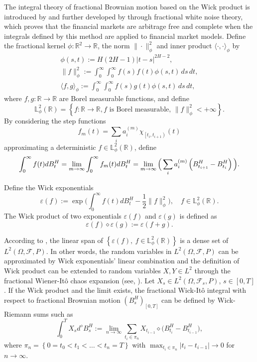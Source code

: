 \documentclass[10pt,a4paper]{amsart}
\numberwithin{equation}{section}
\begin{document}
The integral theory of fractional Brownian motion based on the Wick product is 
introduced by \cite{duncan2000stochastic} and further developed by 
\cite{hu2003fractional} through fractional white noise theory, which proves that 
the financial markets are arbitrage free and complete when the integrals defined by 
this method are applied to financial market models. Define the fractional kernel 
$\phi: \mathbb{R}^2 \to \mathbb{R}$, the norm $\|\cdot\|_\phi^2$ and inner
product $\langle\cdot, \cdot\rangle_\phi$ by
\begin{gather*}
\phi(s, t):=H(2 H-1)|t-s|^{2 H-2} ,\\
\|f\|_\phi^2  :=\int_0^{\infty} \int_0^{\infty} f(s) f(t) \phi(s, t) \,ds\,dt, \\
\langle f, g\rangle_\phi  :=\int_0^{\infty} \int_0^{\infty} f(s) g(t) \phi(s, t) \,ds\,dt,
\end{gather*}
where
$f, g:\mathbb{R} \to \mathbb{R}$ are Borel measurable functions, and define
\[
 \mathbb{L}_\phi^2\left(\mathbb{R}\right)=\left\{f:\mathbb{R} \to \mathbb{R},
 f  \text{ is Borel measurable, } \|f\|_\phi^2<+\infty\right\}.
\]
By considering the step functions
\[
 f_m(t)=\sum_i a_i^{(m)} \chi_{\left[t_i, t_{i+1}\right)}\left(t\right)
\]
approximating a deterministic $f \in \mathbb{L}_\phi^2\left(\mathbb{R}\right)$, define
\[
 \int_{0}^{\infty} f(t) d B_t^H
 =\lim _{m \to \infty} \int_{0}^{\infty}f_m(t) d B_t^H \\
 =\lim _{m \to \infty}\Big(\sum_i a_i^{(m)}\left(B_{t_{i+1}}^H-B_{t_i}^H\right)\Big).
\]

Define the Wick exponentials
\[
 \varepsilon(f):=\exp \Big(\int_0^{\infty} f(t) d B^H_t-\frac{1}{2}\|f\|_\phi^2\Big),
\quad f \in \mathbb{L}_\phi^2\left(\mathbb{R}\right).
\]
The Wick product of two exponentials $\varepsilon(f)$ and $\varepsilon(g)$ 
is defined as
\[
 \varepsilon(f) \diamond \varepsilon(g):=\varepsilon(f+g).
\]

According to \cite[Theorem 3.1]{duncan2000stochastic}, the linear span of 
$\left\{\varepsilon(f), \ f \in \mathbb{L}_\phi^2\left(\mathbb{R}\right)\right\}$ 
is a dense set of $L^2\left( \Omega,\mathcal{F} ,P \right)$. 
In other words, the random variables in $L^2\left( \Omega,\mathcal{F} ,P \right)$ 
can be approximated by Wick exponentials' linear combination and the definition 
of Wick product can be extended to random variables $X, Y \in L^2$ through the 
fractional Wiener-It\^o chaos expansion (see, \cite{hu2003fractional}). 
Let $X_s \in L^2\left( \Omega,\mathcal{F}_s ,P \right)$, $s \in \left[0,T\right]$. 
If the Wick product and the limit exists, the fractional Wick-It\^o integral with 
respect to fractional Brownian motion $\left(B_s^H\right)_{[0, T]}$ can be defined 
by Wick-Riemann sums such as
\[
 \int_0^T X_s d^{\diamond} B_s^H:=\lim _{n \to \infty} 
 \sum_{t_i \in \pi_n} X_{t_{i-1}} \diamond\big(B_{t_i}^H-B_{t_{i-1}}^H\big),
\]
where $\pi_n=\left\{0=t_0<t_1<\dots<t_n=T\right\}$ with
$\max _{t_i \in \pi_n}\left|t_i-t_{i-1}\right| \to 0$ for $n \to \infty$.
\end{document}
